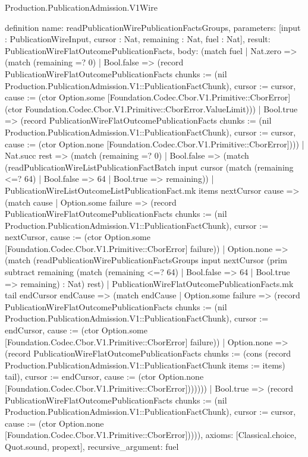 \begin{lexlean}{Production.PublicationAdmission.V1Wire}
\begin{semanticmodule}
definition{
  name: readPublicationWirePublicationFactsGroups,
  parameters: [input : PublicationWireInput, cursor : Nat, remaining : Nat, fuel : Nat],
  result: PublicationWireFlatOutcomePublicationFacts,
  body: (match fuel
    | Nat.zero => (match (remaining =? 0)
      | Bool.false => (record PublicationWireFlatOutcomePublicationFacts {chunks := (nil Production.PublicationAdmission.V1::PublicationFactChunk), cursor := cursor, cause := (ctor Option.some [Foundation.Codec.Cbor.V1.Primitive::CborError] (ctor Foundation.Codec.Cbor.V1.Primitive::CborError.ValueLimit))})
      | Bool.true => (record PublicationWireFlatOutcomePublicationFacts {chunks := (nil Production.PublicationAdmission.V1::PublicationFactChunk), cursor := cursor, cause := (ctor Option.none [Foundation.Codec.Cbor.V1.Primitive::CborError])}))
    | Nat.succ rest => (match (remaining =? 0)
      | Bool.false => (match (readPublicationWireListPublicationFactBatch input cursor (match (remaining <=? 64)
          | Bool.false => 64
          | Bool.true => remaining))
        | PublicationWireListOutcomeListPublicationFact.mk items nextCursor cause => (match cause
          | Option.some failure => (record PublicationWireFlatOutcomePublicationFacts {chunks := (nil Production.PublicationAdmission.V1::PublicationFactChunk), cursor := nextCursor, cause := (ctor Option.some [Foundation.Codec.Cbor.V1.Primitive::CborError] failure)})
          | Option.none => (match (readPublicationWirePublicationFactsGroups input nextCursor (prim subtract remaining (match (remaining <=? 64)
              | Bool.false => 64
              | Bool.true => remaining) : Nat) rest)
            | PublicationWireFlatOutcomePublicationFacts.mk tail endCursor endCause => (match endCause
              | Option.some failure => (record PublicationWireFlatOutcomePublicationFacts {chunks := (nil Production.PublicationAdmission.V1::PublicationFactChunk), cursor := endCursor, cause := (ctor Option.some [Foundation.Codec.Cbor.V1.Primitive::CborError] failure)})
              | Option.none => (record PublicationWireFlatOutcomePublicationFacts {chunks := (cons (record Production.PublicationAdmission.V1::PublicationFactChunk {items := items}) tail), cursor := endCursor, cause := (ctor Option.none [Foundation.Codec.Cbor.V1.Primitive::CborError])})))))
      | Bool.true => (record PublicationWireFlatOutcomePublicationFacts {chunks := (nil Production.PublicationAdmission.V1::PublicationFactChunk), cursor := cursor, cause := (ctor Option.none [Foundation.Codec.Cbor.V1.Primitive::CborError])}))),
  axioms: [Classical.choice, Quot.sound, propext],
  recursive_argument: fuel
}


\end{semanticmodule}
\end{lexlean}

